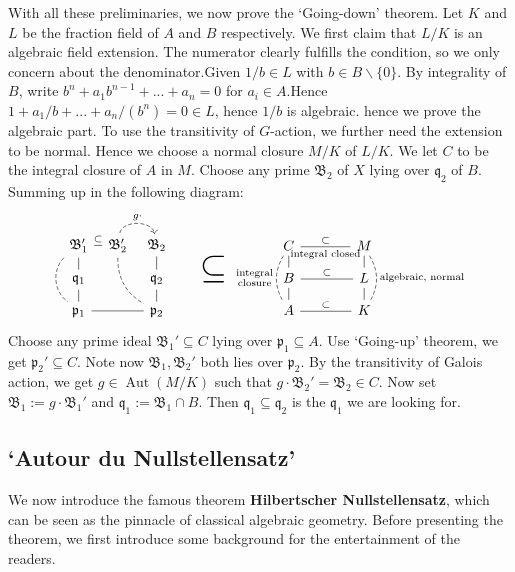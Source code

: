 \documentclass[12pt]{article}
\theoremstyle{definition}
\theoremstyle{plain}
\DeclareMathOperator{\Aut}{Aut}
\begin{document}
With all these preliminaries, we now prove the `Going-down' theorem.
\proof Let $K$ and $L$ be the fraction field of $A$ and $B$ respectively. We first claim that $L/K$ is an algebraic field extension. The numerator clearly fulfills the condition, so we only concern about the denominator.Given $1/b\in L$ with $b\in B\backslash\{0\}$. By integrality of $B$, write $b^n+a_1b^{n-1}+...+a_n=0$ for $a_i\in A$.Hence $1+a_1/b+...+a_n/(b^n)=0\in L$, hence $1/b$ is algebraic. hence we prove the algebraic part. To use the transitivity of $G$-action, we further need the extension to be normal. Hence we choose a normal closure $M/K$ of $L/K$. We let $C$ to be the integral closure of $A$ in $M$. Choose any prime $\mathfrak{B}_2$ of $X$ lying over $\mathfrak{q}_2$ of $B$. Summing up in the following diagram:
\begin{equation}
  \begin{tikzcd}[column sep=tiny, row sep=small]
    \mathfrak{B}_1'\dar[-]\ar[-,dashed, bend right=50]{dd}\ar[-]{r}{\subset}&\mathfrak{B}_2'\ar[-, bend right, dashed]{rdd}\rar[dashed, bend left=80]{g\cdot }&\mathfrak{B}_2 \dar[-]\\
    \mathfrak{q}_1\dar[-]& &\mathfrak{q}_2\dar[-]\\
    \mathfrak{p}_1\ar[-]{rr}& &\mathfrak{p}_2
  \end{tikzcd}\qquad\mbox{\Huge$\subseteq$}
  \begin{tikzcd}[column sep=large, row sep=small]
    &C\ar[-, bend right, dashed]{dd}[swap]{\substack{\text{integral}\\\text{closure}}}\rar[-]{\subset}[swap]{\text{integral closed}}\dar[-]&M\ar[-]{d}\ar[-, bend left, dashed]{dd}{\text{algebraic, normal}}\\
    &B\rar[-]{\subset}\dar[-]&L\dar[-]\\
    &A\rar[-]{\subset}&K
  \end{tikzcd}
\end{equation}
Choose any prime ideal $\mathfrak{B}_1'\subseteq C$ lying over $\mathfrak{p}_1\subseteq A$. Use `Going-up' theorem, we get $\mathfrak{p}_2'\subseteq C$. Note now $\mathfrak{B}_1, \mathfrak{B}_2'$ both lies over $\mathfrak{p}_2$. By the transitivity of Galois action, we get $g\in \Aut(M/K)$ such that $g\cdot \mathfrak{B}_2'=\mathfrak{B}_2\in C$. Now set $\mathfrak{B}_1:=g\cdot \mathfrak{B}_1'$ and $\mathfrak{q}_1:=\mathfrak{B}_1\cap B$. Then $\mathfrak{q}_1\subseteq \mathfrak{q}_2$ is the $\mathfrak{q}_1$ we are looking for.


\subsection{`Autour du Nullstellensatz'}
We now introduce the famous theorem \textbf{Hilbertscher Nullstellensatz}, which can be seen as the pinnacle of classical algebraic geometry. Before presenting the theorem, we first introduce some background for the entertainment of the readers.
\end{document}
